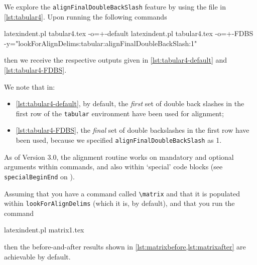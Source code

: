  \begin{example}
 We explore the \texttt{alignFinalDoubleBackSlash} feature by using the file in
 \cref{lst:tabular4}. Upon running the following commands   %

 \begin{commandshell}
latexindent.pl tabular4.tex -o=+-default
latexindent.pl tabular4.tex -o=+-FDBS -y="lookForAlignDelims:tabular:alignFinalDoubleBackSlash:1"
\end{commandshell}

 then we receive the respective outputs given in \cref{lst:tabular4-default} and
 \cref{lst:tabular4-FDBS}.

 \begin{cmhtcbraster}[raster columns=3,
   raster left skip=-3.75cm,
   raster right skip=-2cm,]
 \end{cmhtcbraster}

 We note that in:
 \begin{itemize}
  \item \cref{lst:tabular4-default}, by default, the \emph{first} set of double back
        slashes in the first row of the \texttt{tabular} environment have been used for
        alignment;
  \item \cref{lst:tabular4-FDBS}, the \emph{final} set of double backslashes in the
        first row have been used, because we specified \texttt{alignFinalDoubleBackSlash} as 1.
 \end{itemize}
 \end{example}

 As of Version 3.0, the alignment routine works on mandatory and optional arguments within
 commands, and also within `special' code blocks (see \texttt{specialBeginEnd} on
 ).

 \begin{example}
 Assuming that you have a command called \lstinline!\matrix! and that it is populated
 within \texttt{lookForAlignDelims} (which it is, by default), and that you run the
 command

 \begin{commandshell}
latexindent.pl matrix1.tex 
\end{commandshell}

 then the before-and-after results shown in \cref{lst:matrixbefore,lst:matrixafter} are
 achievable by default.

 \begin{cmhtcbraster}
 \end{cmhtcbraster}
 \end{example}


